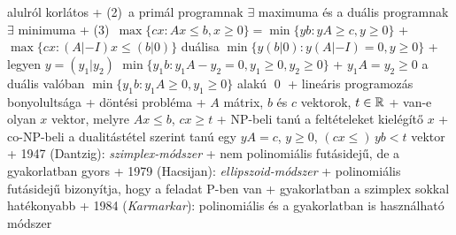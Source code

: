       alulról korlátos
    + (2)~a primál programnak $\exists$ maximuma és a duális programnak
      $\exists$ minimuma
    + (3)~$\max \{ cx : Ax \le b, x \ge 0 \} = \min \{ yb : yA \ge c,
      y \ge 0 \}$
  + \proof $\max \{ cx : (A | {-I}) x \le (b | 0) \}$ duálisa $\min \{ y
    (b | 0) : y (A | {-I}) = 0, y \ge 0 \}$
    + legyen $y = (y_1 | y_2)$ \RA $\min \{ y_1 b : y_1 A - y_2 = 0,
      y_1 \ge 0, y_2 \ge 0\}$
    + $y_1 A = y_2 \ge 0$ \RA a duális valóban
      $\min \{ y_1 b : y_1 A \ge 0, y_1 \ge 0 \}$ alakú \qed
+ lineáris programozás bonyolultsága
  + döntési probléma
    + \DataIn $A$ mátrix, $b$ és $c$ vektorok, $t \in \mathbb{R}$
    + \DataOut van-e olyan $x$ vektor, melyre $Ax \le b$, $cx \ge t$
  + NP-beli \ra tanú a feltételeket kielégítő $x$
  + co-NP-beli \ra a dualitástétel szerint tanú egy $yA = c$, $y \ge
    0$, $(cx \le )\,yb < t$ vektor
  + 1947 (Dantzig): \emph{szimplex-módszer}
    + nem polinomiális futásidejű, de a gyakorlatban gyors
  + 1979 (Hacsijan): \emph{ellipszoid-módszer}
    + polinomiális futásidejű \RA bizonyítja, hogy a feladat P-ben van
    + gyakorlatban a szimplex sokkal hatékonyabb
  + 1984 (\emph{Karmarkar}): polinomiális és a gyakorlatban is használható módszer


